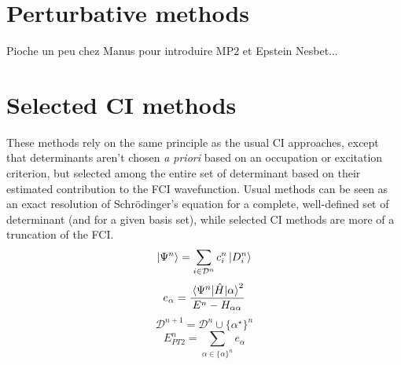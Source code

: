 \documentclass[./thesis.tex]{subfiles}
\begin{document}
\section{Perturbative methods}

\alert{Pioche un peu chez Manus pour introduire MP2 et Epstein Nesbet...}

\section{Selected CI methods}

These methods rely on the same principle as the usual CI approaches, except that determinants aren't chosen \textit{a priori} based on an occupation or excitation criterion, but selected among the entire set of determinant based on their estimated contribution to the FCI wavefunction. Usual methods can be seen as an exact resolution of Schrödinger's equation for a complete, well-defined set of determinant (and for a given basis set), while selected CI methods are more of a truncation of the FCI.
\begin{equation}
\ket{\Psi^{n}} = \sum_{i \in \mathcal{D}^n} c_i^{n} \ket{D^n_i}
\end{equation}
\begin{equation}
e_\alpha = \frac{\mel{\Psi^n}{\hat{H}}{\alpha}^2}{E^n - H_{\alpha \alpha}}
\end{equation}
\begin{equation}
\mathcal{D}^{n+1} = \mathcal{D}^{n} \cup \{ \alpha^\star \}^n
\end{equation}
\begin{equation}
E_{PT2}^n = \sum_{\alpha \in \{\alpha \}^n} e_\alpha
\end{equation}
\end{document}
